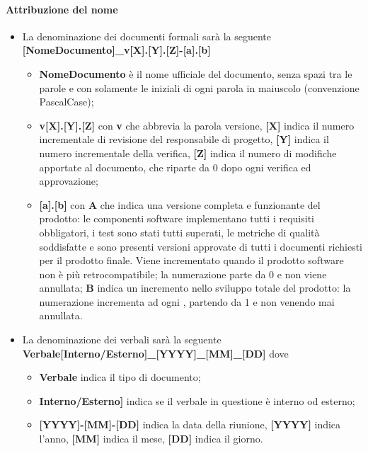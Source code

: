 \paragraph{Attribuzione del nome}
\begin{itemize}
	\item La denominazione dei documenti formali sarà la seguente \newline
	\textbf{[NomeDocumento]\_v[X].[Y].[Z]-[a].[b]}
	\begin{itemize}
		\item \textbf{NomeDocumento} è il nome ufficiale del documento, senza spazi tra le parole e con solamente le iniziali di ogni parola in maiuscolo (convenzione PascalCase);
		\item \textbf{v[X].[Y].[Z]} con \textbf{v} che abbrevia la parola versione, \textbf{[X]} indica il numero incrementale di revisione del responsabile di progetto, \textbf{[Y]} indica il numero incrementale della verifica, \textbf{[Z]} indica il numero di modifiche apportate al documento, che riparte da 0 dopo ogni verifica ed approvazione;
		\item \textbf{[a].[b]} con \textbf{A} che indica una versione completa e funzionante del prodotto: le componenti software
implementano tutti i requisiti obbligatori, i test sono stati tutti superati, le metriche di qualità soddisfatte e sono presenti versioni approvate di tutti i documenti richiesti per il prodotto finale. Viene incrementato quando il prodotto software non è più retrocompatibile; la numerazione parte da 0 e non viene annullata; \textbf{B} indica un incremento nello sviluppo totale del prodotto: la numerazione incrementa ad ogni , partendo da 1 e non venendo mai annullata.
	\end{itemize}
	\item La denominazione dei verbali sarà la seguente\newline
	\textbf{Verbale[Interno/Esterno]\_[YYYY]\_[MM]\_[DD]}\newline
	dove
	\begin{itemize}
		\item \textbf{Verbale} indica il tipo di documento;
		\item \textbf{Interno/Esterno]} indica se il verbale in questione è interno od esterno;
		\item \textbf{[YYYY]-[MM]-[DD]} indica la data della riunione, \textbf{[YYYY]} indica l'anno, \textbf{[MM]} indica il mese, \textbf{[DD]} indica il giorno.
	\end{itemize}
\end{itemize}
